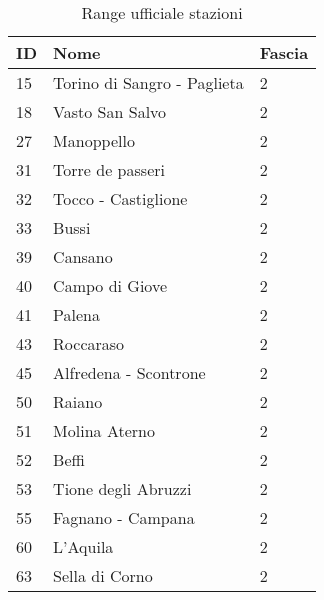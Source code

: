\begin{table}[]
\centering
\caption{Range ufficiale stazioni}
\label{my-label}
\begin{tabular}{|p{1cm}|p{4cm}|p{2cm}|}
\hline
\rowcolor[HTML]{C0C0C0} 
ID  & Nome                                     & Fascia \\ \hline
\rowcolor[HTML]{FFFE65} 
15  & Torino di Sangro - Paglieta              & 2      \\ \hline
\rowcolor[HTML]{FFFE65} 
18  & Vasto San Salvo                          & 2      \\ \hline
\rowcolor[HTML]{FFFE65} 
27  & Manoppello                               & 2      \\ \hline
\rowcolor[HTML]{FFFE65} 
31  & Torre de passeri                         & 2      \\ \hline
\rowcolor[HTML]{FFFE65} 
32  & Tocco - Castiglione                      & 2      \\ \hline
\rowcolor[HTML]{FFFE65} 
33  & Bussi                                    & 2      \\ \hline
\rowcolor[HTML]{FFFE65} 
39  & Cansano                                  & 2      \\ \hline
\rowcolor[HTML]{FFFE65} 
40  & Campo di Giove                           & 2      \\ \hline
\rowcolor[HTML]{FFFE65} 
41  & Palena                                   & 2      \\ \hline
\rowcolor[HTML]{FFFE65} 
43  & Roccaraso                                & 2      \\ \hline
\rowcolor[HTML]{FFFE65} 
45  & Alfredena - Scontrone                    & 2      \\ \hline
\rowcolor[HTML]{FFFE65} 
50  & Raiano                                   & 2      \\ \hline
\rowcolor[HTML]{FFFE65} 
51  & Molina Aterno                            & 2      \\ \hline
\rowcolor[HTML]{FFFE65} 
52  & Beffi                                    & 2      \\ \hline
\rowcolor[HTML]{FFFE65} 
53  & Tione degli Abruzzi                      & 2      \\ \hline
\rowcolor[HTML]{FFFE65} 
55  & Fagnano - Campana                        & 2      \\ \hline
\rowcolor[HTML]{FFFE65} 
60  & L'Aquila                                 & 2      \\ \hline
\rowcolor[HTML]{FFFE65} 
63  & Sella di Corno                           & 2      \\ \hline

\end{tabular}
\end{table}
